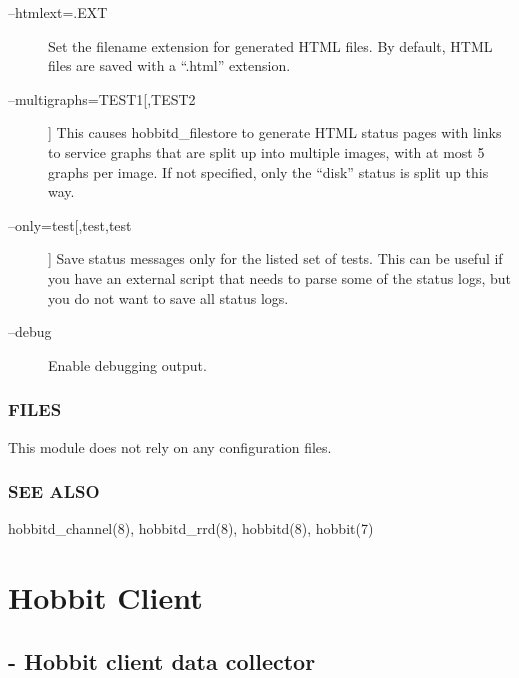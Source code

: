 \begin{description}
 

\item[--htmlext=.EXT] Set the filename extension for generated HTML files. By default, HTML files are saved with a ``.html'' extension. 

 

\item[--multigraphs=TEST1[,TEST2]] This causes hobbitd\_filestore to generate HTML status pages with links to service graphs that are split up into multiple images, with at most 5 graphs per image. If not specified, only the ``disk'' status is split up this way. 

 

\item[--only=test[,test,test]] Save status messages only for the listed set of tests. This can be useful if you have an external script that needs to parse some of the status logs, but you do not want to save all status logs. 

 

\item[--debug] Enable debugging output. 

 


\end{description}
\subsection{FILES}
 This module does not rely on any configuration files. 

 
\subsection{SEE ALSO}
hobbitd\_channel(8), hobbitd\_rrd(8), hobbitd(8), hobbit(7) 

 
  
%
\chapter{Hobbit Client}

%
\section{ - Hobbit client data collector }


